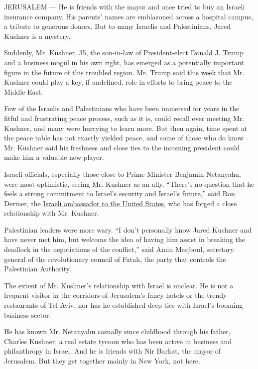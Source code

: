 JERUSALEM --- He is friends with the mayor and once tried to buy an
Israeli insurance company. His parents' names are emblazoned across a
hospital campus, a tribute to generous donors. But to many Israelis and
Palestinians, Jared Kushner is a mystery.

Suddenly, Mr. Kushner, 35, the son-in-law of President-elect Donald J.
Trump and a business mogul in his own right, has emerged as a
potentially important figure in the future of this troubled region. Mr.
Trump said this week that Mr. Kushner could play a key, if undefined,
role in efforts to bring peace to the Middle East.

Few of the Israelis and Palestinians who have been immersed for years in
the fitful and frustrating peace process, such as it is, could recall
ever meeting Mr. Kushner, and many were hurrying to learn more. But then
again, time spent at the peace table has not exactly yielded peace, and
some of those who do know Mr. Kushner said his freshness and close ties
to the incoming president could make him a valuable new player.

Israeli officials, especially those close to Prime Minister Benjamin
Netanyahu, were most optimistic, seeing Mr. Kushner as an ally.
``There's no question that he feels a strong commitment to Israel's
security and Israel's future,'' said Ron Dermer, the
\href{http://www.nytimes.com/2014/07/26/world/middleeast/israels-outspoken-envoy-is-wise-to-us-ways.html}{Israeli
ambassador to the United States}, who has forged a close relationship
with Mr. Kushner.

Palestinian leaders were more wary. ``I don't personally know Jared
Kushner and have never met him, but welcome the idea of having him
assist in breaking the deadlock in the negotiations of the conflict,''
said Amin Maqboul, secretary general of the revolutionary council of
Fatah, the party that controls the Palestinian Authority.

The extent of Mr. Kushner's relationship with Israel is unclear. He is
not a frequent visitor in the corridors of Jerusalem's fancy hotels or
the trendy restaurants of Tel Aviv, nor has he established deep ties
with Israel's booming business sector.

He has known Mr. Netanyahu casually since childhood through his father,
Charles Kushner, a real estate tycoon who has been active in business
and philanthropy in Israel. And he is friends with Nir Barkat, the mayor
of Jerusalem. But they get together mainly in New York, not here.

